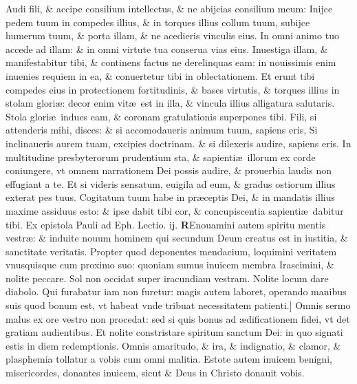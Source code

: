 \documentclass[a5paper,10pt]{book}
\def\leftmarginnote{%
	\lrmarginnote{\hskip -\marginparsep \hskip -6.5em}}
\def\ae{æ}
\begin{document}
\begin{multicols*}{2}
Audi fili, \& accipe consilium intellectus, \& ne abijcias consilium meum: Inijce pedem tuum in compedes illius, \& in torques illius collum tuum, subijce humerum tuum, \& porta illam, \& ne acedieris vinculis eius.
In omni animo tuo accede ad illam: \& in omni virtute tua conserua vias eius. Inuestiga illam, \& manifestabitur tibi, \& continens factus ne derelinquas eam: in nouissimis enim inuenies requiem in ea, \& conuertetur tibi in oblectationem.
Et erunt tibi compedes eius in protectionem fortitudinis, \& bases virtutis, \& torques illius in stolam glori\ae : decor enim vit\ae \ est in illa, \& vincula illius alligatura salutaris.
Stola glori\ae \ indues eam, \& coronam gratulationis superpones tibi. Fili, si attenderis mihi, disces: \& si accomodaueris animum tuum, sapiens eris, Si inclinaueris aurem tuam, excipies doctrinam. \& si dilexeris audire, sapiens eris.
In multitudine presbyterorum prudentium sta, \& sapienti\ae \ illorum ex corde coniungere, vt omnem narrationem Dei possis audire, \& prouerbia laudis non effugiant a te.
Et si videris sensatum, euigila ad eum, \& gradus ostiorum illius exterat pes
tuus. Cogitatum tuum habe in pr\ae ceptis Dei, \& in mandatis illius maxime assiduus esto: \& ipse dabit tibi cor, \& concupiscentia sapienti\ae \ dabitur tibi.
\fancyhead[C]{\color{red} Feria. v. Dominic\ae . ij. Vagantium}
\newline {} \color{red} Ex epistola Pauli ad Eph. \hfill Lectio. ij. \color{black}
\vspace{-2.25em}
\lettrine[lines=2]{\bfseries \color{red} R}{}\textdagger Enouamini\leftmarginnote{\begin{flushright}c.4.d\end{flushright}} autem spiritu mentis vestr\ae : \& induite nouum hominem qui secundum Deum creatus est in iustitia, \& sanctitate veritatis.
Propter quod deponentes mendacium, loquimini veritatem vnusquisque cum proximo suo: quoniam sumus inuicem membra Irascimini, \& nolite peccare.
Sol non occidat super iracundiam vestram. Nolite locum dare diabolo. Qui furabatur iam non furetur: magis autem laboret, operando manibus suis quod bonum est, vt habeat vnde tribuat necessitatem\leftmarginnote{\begin{flushright}E\end{flushright}} patienti.]
Omnis sermo malus ex ore vestro non procedat: sed si quis bonus ad \ae dificationem fidei, vt det gratiam audientibus.
Et nolite constristare spiritum sanctum Dei: in quo signati estis in diem redemptionis.
Omnis amaritudo, \& ira, \& indignatio, \& clamor, \& plasphemia tollatur a vobis cum omni malitia. Estote autem inuicem benigni, misericordes, donantes inuicem, sicut \& Deus in Christo donauit vobis.

\end{multicols*}
\end{document}
